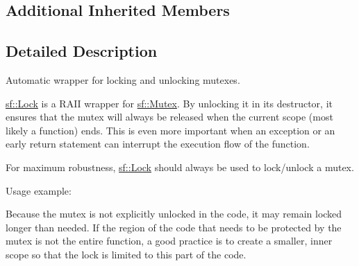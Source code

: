 \subsection*{Additional Inherited Members}


\subsection{Detailed Description}
Automatic wrapper for locking and unlocking mutexes. 

\begin{DoxyVerb}\end{DoxyVerb}


\mbox{\hyperlink{classsf_1_1_lock}{sf\+::\+Lock}} is a R\+A\+II wrapper for \mbox{\hyperlink{classsf_1_1_mutex}{sf\+::\+Mutex}}. By unlocking it in its destructor, it ensures that the mutex will always be released when the current scope (most likely a function) ends. This is even more important when an exception or an early return statement can interrupt the execution flow of the function.

For maximum robustness, \mbox{\hyperlink{classsf_1_1_lock}{sf\+::\+Lock}} should always be used to lock/unlock a mutex.

Usage example\+: 
\begin{DoxyCode}{0}
\DoxyCodeLine{}
\DoxyCodeLine{\textcolor{keywordtype}{void} \textcolor{keyword}{function}()}
\DoxyCodeLine{\{}
\DoxyCodeLine{}
\DoxyCodeLine{}
\DoxyCodeLine{        \textcolor{keywordflow}{return}; \textcolor{comment}{// mutex is unlocked}}
\DoxyCodeLine{}
\DoxyCodeLine{\} \textcolor{comment}{// mutex is unlocked}}
\end{DoxyCode}


Because the mutex is not explicitly unlocked in the code, it may remain locked longer than needed. If the region of the code that needs to be protected by the mutex is not the entire function, a good practice is to create a smaller, inner scope so that the lock is limited to this part of the code.


\begin{DoxyCode}{0}
\DoxyCodeLine{}
\DoxyCodeLine{\textcolor{keywordtype}{void} \textcolor{keyword}{function}()}
\DoxyCodeLine{\{}
\DoxyCodeLine{    \{}
\DoxyCodeLine{}
\DoxyCodeLine{    \} \textcolor{comment}{// mutex is unlocked here}}
\DoxyCodeLine{}
\DoxyCodeLine{\}}
\end{DoxyCode}


